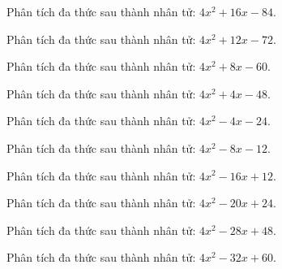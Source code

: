 \begin{bt}
	Phân tích đa thức sau thành nhân tử: $4 x^2 + 16 x - 84$.
\end{bt}
\begin{bt}
	Phân tích đa thức sau thành nhân tử: $4 x^2 + 12 x - 72$.
\end{bt}
\begin{bt}
	Phân tích đa thức sau thành nhân tử: $4 x^2 + 8 x - 60$.
\end{bt}
\begin{bt}
	Phân tích đa thức sau thành nhân tử: $4 x^2 + 4 x - 48$.
\end{bt}
\begin{bt}
	Phân tích đa thức sau thành nhân tử: $4 x^2 - 4 x - 24$.
\end{bt}
\begin{bt}
	Phân tích đa thức sau thành nhân tử: $4 x^2 - 8 x - 12$.
\end{bt}
\begin{bt}
	Phân tích đa thức sau thành nhân tử: $4 x^2 - 16 x + 12$.
\end{bt}
\begin{bt}
	Phân tích đa thức sau thành nhân tử: $4 x^2 - 20 x + 24$.
\end{bt}
\begin{bt}
	Phân tích đa thức sau thành nhân tử: $4 x^2 - 28 x + 48$.
\end{bt}
\begin{bt}
	Phân tích đa thức sau thành nhân tử: $4 x^2 - 32 x + 60$.
\end{bt}
